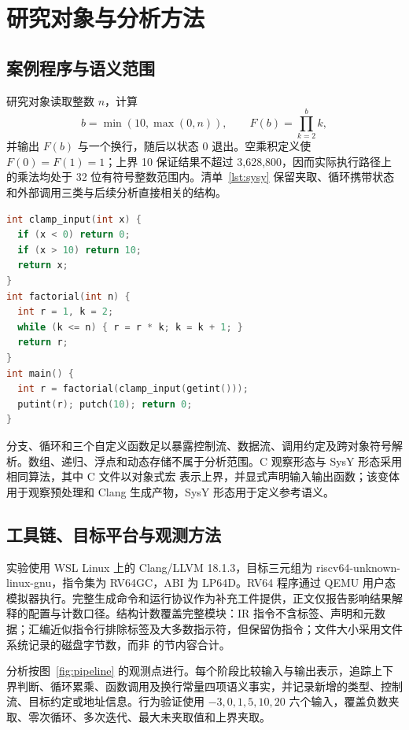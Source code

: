 \section{研究对象与分析方法}
\label{sec:case}

\subsection{案例程序与语义范围}

研究对象读取整数 $n$，计算
\[
b=\min(10,\max(0,n)),\qquad F(b)=\prod_{k=2}^{b}k,
\]
并输出 $F(b)$ 与一个换行，随后以状态 0 退出。空乘积定义使 $F(0)=F(1)=1$；上界 10 保证结果不超过 3,628,800，因而实际执行路径上的乘法均处于 32 位有符号整数范围内。清单~\ref{lst:sysy} 保留夹取、循环携带状态和外部调用三类与后续分析直接相关的结构。

\begin{center}
\begin{minipage}{0.92\linewidth}
\begin{lstlisting}[language=C,caption={SysY 案例的语义核心。},label={lst:sysy}]
int clamp_input(int x) {
  if (x < 0) return 0;
  if (x > 10) return 10;
  return x;
}
int factorial(int n) {
  int r = 1, k = 2;
  while (k <= n) { r = r * k; k = k + 1; }
  return r;
}
int main() {
  int r = factorial(clamp_input(getint()));
  putint(r); putch(10); return 0;
}
\end{lstlisting}
\end{minipage}
\end{center}

分支、循环和三个自定义函数足以暴露控制流、数据流、调用约定及跨对象符号解析。数组、递归、浮点和动态存储不属于分析范围。C 观察形态与 SysY 形态采用相同算法，其中 C 文件以对象式宏  表示上界，并显式声明输入输出函数；该变体用于观察预处理和 Clang 生成产物，SysY 形态用于定义参考语义。

\subsection{工具链、目标平台与观测方法}

实验使用 WSL Linux 上的 Clang/LLVM 18.1.3，目标三元组为 riscv64-unknown-linux-gnu，指令集为 RV64GC，ABI 为 LP64D。RV64 程序通过 QEMU 用户态模拟器执行。完整生成命令和运行协议作为补充工件提供，正文仅报告影响结果解释的配置与计数口径。结构计数覆盖完整模块：IR 指令不含标签、声明和元数据；汇编近似指令行排除标签及大多数指示符，但保留伪指令；文件大小采用文件系统记录的磁盘字节数，而非  的节内容合计。

分析按图~\ref{fig:pipeline} 的观测点进行。每个阶段比较输入与输出表示，追踪上下界判断、循环累乘、函数调用及换行常量四项语义事实，并记录新增的类型、控制流、目标约定或地址信息。行为验证使用 $-3,0,1,5,10,20$ 六个输入，覆盖负数夹取、零次循环、多次迭代、最大未夹取值和上界夹取。

